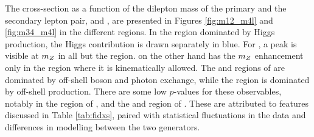 The cross-section as a function of the dilepton mass of the primary and the secondary lepton pair, \mZOne{} and \mZTwo{}, are presented in Figures \ref{fig:m12_m4l} and \ref{fig:m34_m4l} in the different \mFourL{} regions. In the region dominated by Higgs production, the Higgs contribution is drawn separately in blue. For \mZOne{}, a peak is visible at $m_{Z}$ in all but the \ZFourL{} region. \mZTwo{} on the other hand has the $m_{Z}$ enhancement only in the \onshellZZ{} region where it is kinematically allowed. The \ZFourL{} and \offshellZZ{} regions of \mZTwo{} are dominated by off-shell \Z boson and photon exchange, while the \HFourL{} region is dominated by off-shell \Z production. There are some low $p$-values for these observables, notably in the \onshellZZ{} region of \mZOne{}, and the \HFourL{} and \offshellZZ{} region of \mZTwo{}. These are attributed to features discussed in Table \ref{tab:fidxs}, paired with statistical fluctuations in the data and differences in modelling between the two generators. 
